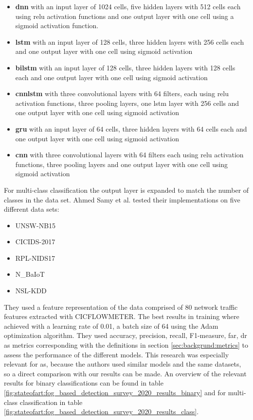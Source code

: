 \begin{itemize}
	\item \textbf{\gls{dnn}} with an input layer of 1024 cells, five hidden layers with 512 cells each using \gls{relu} activation functions and one output layer with one cell using a sigmoid activation function.
	\item \textbf{\gls{lstm}} with an input layer of 128 cells, three hidden layers with 256 cells each and one output layer with one cell using sigmoid activation 
	\item \textbf{\gls{bilstm}} with an input layer of 128 cells, three hidden layers with 128 cells each and one output layer with one cell using sigmoid activation
	\item \textbf{\gls{cnnlstm}} with three convolutional layers with 64 filters, each using \gls{relu} activation functions, three pooling layers, one \gls{lstm} layer with 256 cells and one output layer with one cell using sigmoid activation
	\item \textbf{\gls{gru}} with an input layer of 64 cells, three hidden layers with 64 cells each and one output layer with one cell using sigmoid activation
	\item \textbf{\gls{cnn}} with three convolutional layers with 64 filters each using \gls{relu} activation functions, three pooling layers and one output layer with one cell using sigmoid activation
\end{itemize}

For multi-class classification the output layer is expanded to match the number of classes in the data set. Ahmed Samy et al. tested their implementations on five different data sets:

\begin{itemize}
	\item UNSW-NB15 \cite{unsw_nb15}
	\item CICIDS-2017 \cite{cic_ids_2017}
	\item RPL-NIDS17 \cite{rpl_nids17}
	\item N\_BaIoT \cite{n_baiot}
	\item NSL-KDD \cite{nsl_kdd}
\end{itemize}

They used a feature representation of the data comprised of 80 network traffic features extracted with CICFLOWMETER. The best results in training where achieved with a learning rate of 0.01, a batch size of 64 using the Adam optimization algorithm.
They used accuracy, precision, recall, F1-measure, \gls{far}, \gls{dr} as metrics corresponding with the definitions in section \ref{sec:backgrund:metrics} to assess the performance of the different models. This research was especially relevant for as, because the authors 
used similar models and the same datasets, so a direct comparison with our results can be made.
An overview of the relevant results for binary classifications can be found in table \ref{fig:stateofart:fog_based_detection_survey_2020_results_binary} and for multi-class classification in table \ref{fig:stateofart:fog_based_detection_survey_2020_results_class}.

